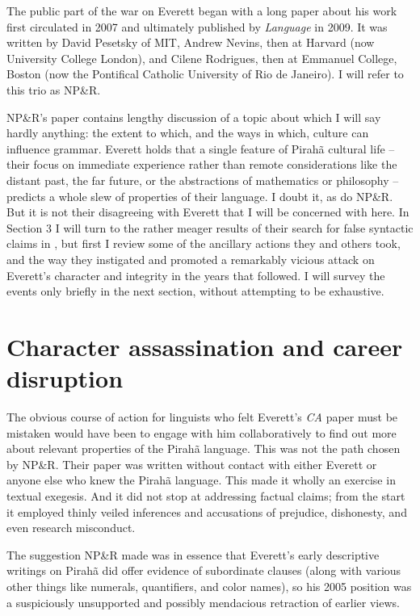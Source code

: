 \documentclass[output=paper,colorlinks,citecolor=brown
]{langscibook}
\begin{document}
The public part of the war on Everett began with a long paper about
his work first circulated in 2007 and ultimately published by
\textit{Language} in 2009. It was written by David Pesetsky of MIT,
Andrew Nevins, then at Harvard (now University College London), and
Cilene Rodrigues, then at Emmanuel College, Boston (now the Pontifical
Catholic University of Rio de Janeiro). I will refer to this trio
as NP\&R.

NP\&R's paper \citep{NevPesRod09a} contains lengthy discussion of a
topic about which I will say hardly anything: the extent to which,
and the ways in which, culture can influence grammar. Everett holds
that a single feature of Pirah{\~a} cultural life -- their focus on
immediate experience rather than remote considerations like the distant
past, the far future, or the abstractions of mathematics or philosophy
-- predicts a whole slew of properties of their language. I doubt it,
as do NP\&R. But it is not their disagreeing with Everett that I will
be concerned with here. In Section 3 I will turn to the rather meager
results of their search for false syntactic claims in \citet{Everett05},
but first I review some of the ancillary actions they and others took,
and the way they instigated and promoted a remarkably vicious attack
on Everett's character and integrity in the years that followed.
I will survey the events only briefly in the next section, without
attempting to be exhaustive.

\section{Character assassination and career disruption}\label{war}

The obvious course of action for linguists who felt Everett's
\textit{CA} paper must be mistaken would have been to engage with
him collaboratively to find out more about relevant properties of the
Pirah{\~a} language. This was not the path chosen by NP\&R. Their
paper was written without contact with either Everett or anyone else
who knew the Pirah{\~a} language. This made it wholly an exercise in
textual exegesis. And it did not stop at addressing factual claims;
from the start it employed thinly veiled inferences and accusations
of prejudice, dishonesty, and even research misconduct.

The suggestion NP\&R made was in essence that Everett's early
descriptive writings on Pirah{\~a} did offer evidence of subordinate
clauses (along with various other things like numerals, quantifiers,
and color names), so his 2005 position was a suspiciously unsupported
and possibly mendacious retraction of earlier views.
\end{document}
